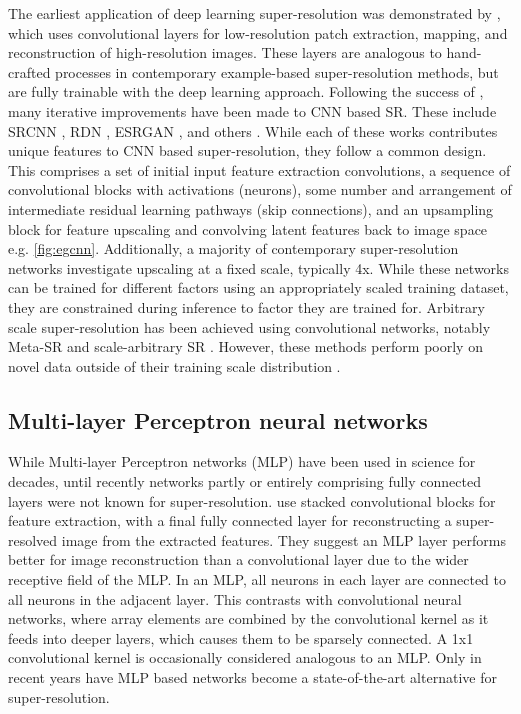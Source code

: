 \documentclass{article}
\begin{document}
The earliest application of deep learning super-resolution was demonstrated by \parencite{dongLearningDeepConvolutional2014,dongImageSuperresolutionUsing2016}, which uses convolutional layers for low-resolution patch extraction, mapping, and reconstruction of high-resolution images.
These layers are analogous to hand-crafted processes in contemporary example-based super-resolution methods, but are fully trainable with the deep learning approach.
Following the success of \cite{dongLearningDeepConvolutional2014}, many iterative improvements have been made to CNN based SR\@.
These include SRCNN \parencite{dongImageSuperresolutionUsing2016}, RDN \parencite{zhangResidualDenseNetwork2018}, ESRGAN \parencite{wangESRGANEnhancedSuperresolution2018}, and others \parencite{ledigPhotorealisticSingleImage2017,limEnhancedDeepResidual2017}.
While each of these works contributes unique features to CNN based super-resolution, they follow a common design.
This comprises a set of initial input feature extraction convolutions, a sequence of convolutional blocks with activations (neurons), some number and arrangement of intermediate residual learning pathways (skip connections), and an upsampling block for feature upscaling and convolving latent features back to image space e.g. \cref{fig:egcnn}.
Additionally, a majority of contemporary super-resolution networks investigate upscaling at a fixed scale, typically 4x.
While these networks can be trained for different factors using an appropriately scaled training dataset, they are constrained during inference to factor they are trained for.
Arbitrary scale super-resolution has been achieved using convolutional networks, notably Meta-SR \parencite{huMetaSRMagnificationarbitraryNetwork2019} and scale-arbitrary SR \parencite{wangLearningSingleNetwork2021}.
However, these methods perform poorly on novel data outside of their training scale distribution \parencite{chenLearningContinuousImage2021}. 

\subsection{Multi-layer Perceptron neural networks}
While Multi-layer Perceptron networks (MLP) have been used in science for decades, until recently networks partly or entirely comprising fully connected layers were not known for super-resolution.
\cite{tangDeepResidualNetworks2020} use stacked convolutional blocks for feature extraction, with a final fully connected layer for reconstructing a super-resolved image from the extracted features.
They suggest an MLP layer performs better for image reconstruction than a convolutional layer due to the wider receptive field of the MLP\@.
In an MLP, all neurons in each layer are connected to all neurons in the adjacent layer.
This contrasts with convolutional neural networks, where array elements are combined by the convolutional kernel as it feeds into deeper layers, which causes them to be sparsely connected.
A 1x1 convolutional kernel is occasionally considered analogous to an MLP\@.
Only in recent years have MLP based networks become a state-of-the-art alternative for super-resolution.
\end{document}
